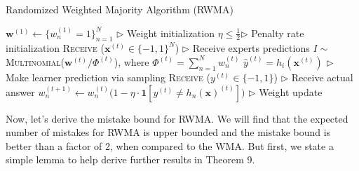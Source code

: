 \documentclass[11pt]{article}
\begin{document}
\begin{algorithm}[H]
\caption{Randomized Weighted Majority Algorithm (RWMA)}
\label{algo:rwma}
\begin{algorithmic}[1]
\STATE $\textbf{w}^{(1)} \leftarrow \{w_n^{(1)}=1\}_{n=1}^N$ \hfill $\triangleright$ Weight initialization
\STATE $\eta\leq\frac{1}{2}$\hfill $\triangleright$ Penalty rate initialization
\STATE \textsc{Receive} ($\textbf{x}^{(t)}\in\{-1, 1\}^N$) \hfill $\triangleright$ Receive experts predictions
\STATE $I\sim$ \textsc{Multinomial}($\textbf{w}^{(t)}/\Phi^{(t)}$), where $\Phi^{(t)}=\sum_{n=1}^Nw_n^{(t)}$
\STATE $\hat{y}^{(t)}=h_i(\textbf{x}^{(t)})$ \hfill $\triangleright$ Make learner prediction via sampling
\STATE \textsc{Receive} ($y^{(t)}\in\{-1, 1\}$) \hfill $\triangleright$ Receive actual answer
\STATE $w_n^{(t+1)}\leftarrow w_n^{(t)}\big(1-\eta\cdot\textbf{1}[y^{(t)}\neq h_n(\textbf{x})^{(t)}]\big)$ \hfill $\triangleright$ Weight update
\ENDFOR
\end{algorithmic}
\end{algorithm}

Now, let's derive the mistake bound for RWMA. We will find that the expected number of mistakes for RWMA is upper bounded and the mistake bound is better than a factor of 2, when compared to the WMA. But first, we state a simple lemma to help derive further results in Theorem 9.
\end{document}

